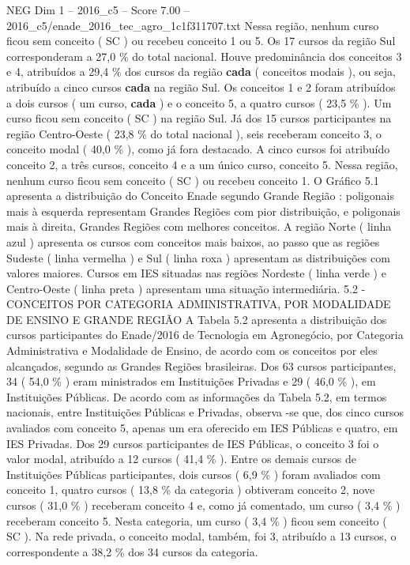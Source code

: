 \begin{textsample}{NEG Dim 1 – 2016\_c5 – Score 7.00 – 2016\_c5/enade\_2016\_tec\_agro\_1c1f311707.txt}
Nessa região, nenhum curso ficou sem conceito ( SC ) ou recebeu conceito 1 ou 5.
Os 17 cursos da região Sul corresponderam a 27,0 \% do total nacional.
Houve predominância dos conceitos 3 e 4, atribuídos a 29,4 \% dos cursos da região \textbf{cada} ( conceitos modais ), ou seja, atribuído a cinco cursos \textbf{cada} na região Sul.
Os conceitos 1 e 2 foram atribuídos a dois cursos ( um curso, \textbf{cada} ) e o conceito 5, a quatro cursos ( 23,5 \% ).
Um curso ficou sem conceito ( SC ) na região Sul.
Já dos 15 cursos participantes na região Centro-Oeste ( 23,8 \% do total nacional ), seis receberam conceito 3, o conceito modal ( 40,0 \% ), como já fora destacado.
A cinco cursos foi atribuído conceito 2, a três cursos, conceito 4 e a um único curso, conceito 5.
Nessa região, nenhum curso ficou sem conceito ( SC ) ou recebeu conceito 1.
O Gráfico 5.1 apresenta a distribuição do Conceito Enade segundo Grande Região : poligonais mais à esquerda representam Grandes Regiões com pior distribuição, e poligonais mais à direita, Grandes Regiões com melhores conceitos.
A região Norte ( linha azul ) apresenta os cursos com conceitos mais baixos, ao passo que as regiões Sudeste ( linha vermelha ) e Sul ( linha roxa ) apresentam as distribuições com valores maiores.
Cursos em IES situadas nas regiões Nordeste ( linha verde ) e Centro-Oeste ( linha preta ) apresentam uma situação intermediária. 5.2 - CONCEITOS POR CATEGORIA ADMINISTRATIVA, POR MODALIDADE DE ENSINO E GRANDE REGIÃO A Tabela 5.2 apresenta a distribuição dos cursos participantes do Enade/2016 de Tecnologia em Agronegócio, por Categoria Administrativa e Modalidade de Ensino, de acordo com os conceitos por eles alcançados, segundo as Grandes Regiões brasileiras.
Dos 63 cursos participantes, 34 ( 54,0 \% ) eram ministrados em Instituições Privadas e 29 ( 46,0 \% ), em Instituições Públicas.
De acordo com as informações da Tabela 5.2, em termos nacionais, entre Instituições Públicas e Privadas, observa -se que, dos cinco cursos avaliados com conceito 5, apenas um era oferecido em IES Públicas e quatro, em IES Privadas.
Dos 29 cursos participantes de IES Públicas, o conceito 3 foi o valor modal, atribuído a 12 cursos ( 41,4 \% ).
Entre os demais cursos de Instituições Públicas participantes, dois cursos ( 6,9 \% ) foram avaliados com conceito 1, quatro cursos ( 13,8 \% da categoria ) obtiveram conceito 2, nove cursos ( 31,0 \% ) receberam conceito 4 e, como já comentado, um curso ( 3,4 \% ) receberam conceito 5.
Nesta categoria, um curso ( 3,4 \% ) ficou sem conceito ( SC ).
Na rede privada, o conceito modal, também, foi 3, atribuído a 13 cursos, o correspondente a 38,2 \% dos 34 cursos da categoria.

\end{textsample}
